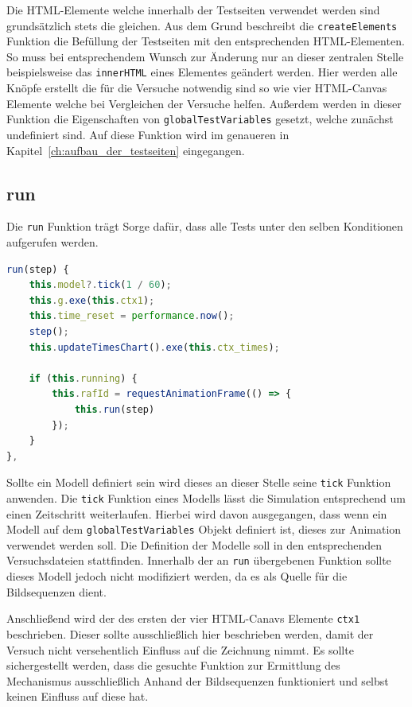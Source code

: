 Die HTML-Elemente welche innerhalb der Testseiten verwendet werden sind grundsätzlich stets die gleichen.
Aus dem Grund beschreibt die \lstinline{createElements} Funktion die Befüllung der Testseiten mit den entsprechenden HTML-Elementen.
So muss bei entsprechendem Wunsch zur Änderung nur an dieser zentralen Stelle beispielsweise das \lstinline{innerHTML} eines Elementes geändert werden.
Hier werden alle Knöpfe erstellt die für die Versuche notwendig sind so wie vier HTML-Canvas Elemente welche bei Vergleichen der Versuche helfen.
Au{\ss}erdem werden in dieser Funktion die Eigenschaften von \lstinline{globalTestVariables} gesetzt, welche zunächst undefiniert sind.
Auf diese Funktion wird im genaueren in Kapitel~\ref{ch:aufbau_der_testseiten} eingegangen.

\subsection{run}\label{ch:gtv_run}

Die \lstinline{run} Funktion trägt Sorge dafür, dass alle Tests unter den selben Konditionen aufgerufen werden.

\begin{lstlisting}[language=JavaScript, caption={Definition der \lstinline{globalTestVariables.run} Funktion.}, label={lst:gtv_run}]
run(step) {
    this.model?.tick(1 / 60);
    this.g.exe(this.ctx1);
    this.time_reset = performance.now();
    step();
    this.updateTimesChart().exe(this.ctx_times);

    if (this.running) {
        this.rafId = requestAnimationFrame(() => {
            this.run(step)
        });
    }
},
\end{lstlisting}

Sollte ein  Modell definiert sein wird dieses an dieser Stelle seine \lstinline{tick} Funktion anwenden.
Die \lstinline{tick} Funktion eines  Modells lässt die Simulation entsprechend um einen Zeitschritt weiterlaufen.
Hierbei wird davon ausgegangen, dass wenn ein  Modell auf dem \lstinline{globalTestVariables} Objekt definiert ist, dieses zur Animation verwendet werden soll.
Die Definition der Modelle soll in den entsprechenden Versuchsdateien stattfinden.
Innerhalb der an \lstinline{run} übergebenen Funktion sollte dieses Modell jedoch nicht modifiziert werden, da es als Quelle für die Bildsequenzen dient.

Anschlie{\ss}end wird der  des ersten der vier HTML-Canavs Elemente \lstinline{ctx1} beschrieben.
Dieser sollte ausschlie{\ss}lich hier beschrieben werden, damit der Versuch nicht versehentlich Einfluss auf die Zeichnung nimmt.
Es sollte sichergestellt werden, dass die gesuchte Funktion zur Ermittlung des Mechanismus ausschlie{\ss}lich Anhand der Bildsequenzen funktioniert und selbst keinen Einfluss auf diese hat.

